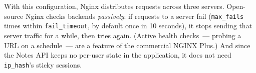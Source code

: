 \begin{codebox}[short]

\begin{Shaded}
\begin{Highlighting}[]



\NormalTok{\}}
\end{Highlighting}
\end{Shaded}

\end{codebox}

\noindent{}With this configuration, Nginx distributes requests across three servers. Open-source Nginx checks backends \emph{passively}: if requests to a server fail (\texttt{max\_fails} times within \texttt{fail\_timeout}, by default once in 10 seconds), it stops sending that server traffic for a while, then tries again. (Active health checks~--- probing a URL on a schedule~--- are a feature of the commercial NGINX Plus.) And since the Notes API keeps no per-user state in the application, it does not need \texttt{ip\_hash}'s sticky sessions.

